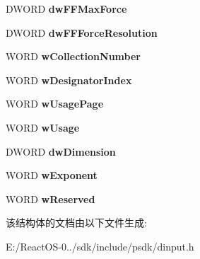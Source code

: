 \begin{DoxyCompactItemize}
D\+W\+O\+RD {\bfseries dw\+F\+F\+Max\+Force}
\item 
\mbox{\label{struct_d_i_d_e_v_i_c_e_o_b_j_e_c_t_i_n_s_t_a_n_c_e_a_a09065880b51be7eb7a05149bdd096c9d}} 
D\+W\+O\+RD {\bfseries dw\+F\+F\+Force\+Resolution}
\item 
\mbox{\label{struct_d_i_d_e_v_i_c_e_o_b_j_e_c_t_i_n_s_t_a_n_c_e_a_af387b174698bc6f9581974e5bbb22ac8}} 
W\+O\+RD {\bfseries w\+Collection\+Number}
\item 
\mbox{\label{struct_d_i_d_e_v_i_c_e_o_b_j_e_c_t_i_n_s_t_a_n_c_e_a_ad8c9a9aa5493949ac085ddd966bdb5c9}} 
W\+O\+RD {\bfseries w\+Designator\+Index}
\item 
\mbox{\label{struct_d_i_d_e_v_i_c_e_o_b_j_e_c_t_i_n_s_t_a_n_c_e_a_a321be32a18cddc73a729e0433e529a25}} 
W\+O\+RD {\bfseries w\+Usage\+Page}
\item 
\mbox{\label{struct_d_i_d_e_v_i_c_e_o_b_j_e_c_t_i_n_s_t_a_n_c_e_a_ade26ba2a889dd752d9c3dde6016aad83}} 
W\+O\+RD {\bfseries w\+Usage}
\item 
\mbox{\label{struct_d_i_d_e_v_i_c_e_o_b_j_e_c_t_i_n_s_t_a_n_c_e_a_a6962b084388876cdb1d17d2654f678d8}} 
D\+W\+O\+RD {\bfseries dw\+Dimension}
\item 
\mbox{\label{struct_d_i_d_e_v_i_c_e_o_b_j_e_c_t_i_n_s_t_a_n_c_e_a_a14b3eb33b41d27931e4e10557c6003b3}} 
W\+O\+RD {\bfseries w\+Exponent}
\item 
\mbox{\label{struct_d_i_d_e_v_i_c_e_o_b_j_e_c_t_i_n_s_t_a_n_c_e_a_a4d0d56c60e034639867934143d7bc488}} 
W\+O\+RD {\bfseries w\+Reserved}
\end{DoxyCompactItemize}


该结构体的文档由以下文件生成\+:\begin{DoxyCompactItemize}
\item 
E\+:/\+React\+O\+S-\/0../sdk/include/psdk/dinput.\+h\end{DoxyCompactItemize}
